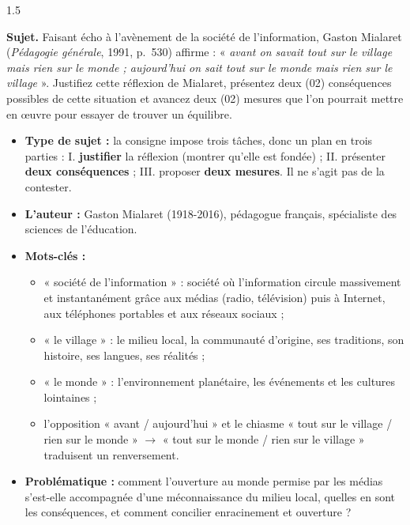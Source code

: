 \documentclass[12pt]{article}
\begin{document}
\begin{spacing}{1.5}

\noindent\textbf{Sujet.} Faisant écho à l'avènement de la société de l'information, Gaston Mialaret (\emph{Pédagogie générale}, 1991, p.~530) affirme : « \emph{avant on savait tout sur le village mais rien sur le monde ; aujourd'hui on sait tout sur le monde mais rien sur le village} ». Justifiez cette réflexion de Mialaret, présentez deux (02) conséquences possibles de cette situation et avancez deux (02) mesures que l'on pourrait mettre en œuvre pour essayer de trouver un équilibre.



\begin{itemize}
\item \textbf{Type de sujet :} la consigne impose trois tâches, donc un plan en trois parties : I. \textbf{justifier} la réflexion (montrer qu'elle est fondée) ; II. présenter \textbf{deux conséquences} ; III. proposer \textbf{deux mesures}. Il ne s'agit pas de la contester.
\item \textbf{L'auteur :} Gaston Mialaret (1918-2016), pédagogue français, spécialiste des sciences de l'éducation.
\item \textbf{Mots-clés :}
  \begin{itemize}
  \item « société de l'information » : société où l'information circule massivement et instantanément grâce aux médias (radio, télévision) puis à Internet, aux téléphones portables et aux réseaux sociaux ;
  \item « le village » : le milieu local, la communauté d'origine, ses traditions, son histoire, ses langues, ses réalités ;
  \item « le monde » : l'environnement planétaire, les événements et les cultures lointaines ;
  \item l'opposition « avant / aujourd'hui » et le chiasme « tout sur le village / rien sur le monde » $\to$ « tout sur le monde / rien sur le village » traduisent un renversement.
  \end{itemize}
\item \textbf{Problématique :} comment l'ouverture au monde permise par les médias s'est-elle accompagnée d'une méconnaissance du milieu local, quelles en sont les conséquences, et comment concilier enracinement et ouverture ?
\end{itemize}


\end{spacing}
\end{document}
